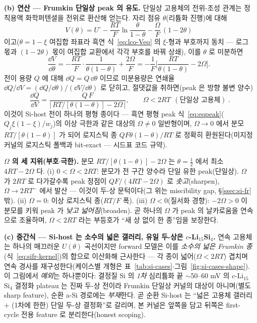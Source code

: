 \textbf{(b) 연산 --- Frumkin 단일상 peak 의 유도.} 단일상 고용체의 전위-조성 관계는 정칙용액 화학퍼텐셜을 전위로
환산해 얻는다. 자리 점유 $\theta$(리튬화 진행)에 대해
\begin{equation}
V(\theta)=U^\circ-\frac{RT}{F}\ln\frac{\theta}{1-\theta}-\frac{\Omega}{F}\,(1-2\theta)
\label{eq:sifr-V}
\end{equation}
이고($\theta{=}1{-}\xi$ 여집합 좌표라 흑연 식~\eqref{eq:lco-Veq} 의 $\xi$-형과 부호까지 동치 --- 로그 몫과
$(1-2\theta)$ 몫이 여집합 교환에서 각각 부호를 바꿔 상쇄), 이를 $\theta$ 로 미분하면
\begin{equation}
\frac{\dd V}{\dd\theta}=-\frac{RT}{F}\cdot\frac{1}{\theta(1-\theta)}+\frac{2\Omega}{F}
=-\frac{1}{F}\Big[\frac{RT}{\theta(1-\theta)}-2\Omega\Big].
\label{eq:sifr-dVdtheta}
\end{equation}
전이 용량 $Q$ 에 대해 $\dd Q=Q\,\dd\theta$ 이므로 미분용량은 연쇄율 $\dd Q/\dd V=(\dd Q/\dd\theta)/(\dd V/\dd\theta)$
로 닫히고, 절댓값을 취하면(peak 은 방향 불변 양수)
\begin{equation}
\boxed{\;\frac{\dd Q}{\dd V}=\frac{Q\,F}{\big|\,RT/[\theta(1-\theta)]-2\Omega\,\big|},
\qquad \Omega<2RT\ \ (\text{단일상 고용체})\;.}
\label{eq:sifr-kernel}
\end{equation}
이것이 Si-host 전이 하나의 평형 종이다 --- 흑연 평형 peak 식~\eqref{eq:eqpeak}($Q_j\xi(1-\xi)/w_j$)의 이상 극한과
같은 대상의 $\Omega\ne0$ 일반형이며, $\Omega{\to}0$ 에서 분모 $RT/[\theta(1-\theta)]$ 가 되어 로지스틱 종
$QF\theta(1-\theta)/RT$ 로 정확히 환원된다(미지정 커널의 로지스틱 폴백과 bit-exact --- 시드표 코드 규약).

\begin{signbox}
\textbf{$\Omega$ 의 세 지위(부호$\cdot$극한).} 분모 $RT/[\theta(1-\theta)]-2\Omega$ 는 $\theta{=}\tfrac12$ 에서
최소 $4RT-2\Omega$ 다. (i) $0<\Omega<2RT$: 분모가 전 구간 양수라 단일 유한 peak(단일상). $\Omega$ 가 $2RT$ 로
다가갈수록 peak 정점이 $Q F/(4RT-2\Omega)$ 로 \emph{솟고}(sharpen), $\Omega{\to}2RT^-$ 에서 발산 --- 이것이 두-상
문턱이다(그 위는 miscibility gap, \S\ref{ssec:si-fr} 밖). (ii) $\Omega{=}0$: 이상 로지스틱 종($RT/F$ 폭). (iii)
$\Omega<0$(질서화 경향): $-2\Omega>0$ 이 분모를 키워 peak 가 \emph{낮고 넓어짐}(broaden). 곧 하나의 $\Omega$ 가
peak 의 날카로움을 연속으로 조율하며, $\Omega<2RT$ 라는 부등호가 ``새 상 없이 한 종''임을 보장한다.
\end{signbox}

\textbf{(c) 중간식 --- Si-host 는 소수의 넓은 갤러리, 유일 두-상은 $c$-Li$_{15}$Si$_4$.} 연속 고용체는 하나의
매끄러운 $U(\theta)$ 곡선이지만 forward 모델은 이를 \emph{소수의 넓은 Frumkin 종}(식~\eqref{eq:sifr-kernel})의
합으로 이산화해 근사한다 --- 각 종이 넓어($\Omega<2RT$) 겹치며 연속 경사를 재구성한다(케이스별 개형은
표~\ref{tab:si-cases}$\cdot$그림~\ref{fig:si-cases-shape}). 이 그림에서 \emph{예외}는 하나뿐이다: 결정질 Si 의
\emph{1차} 심리튬화 끝 $\sim$50--60 mV 의 $c$-Li$_{15}$Si$_4$ 결정화 plateau 는 진짜 두-상 전이라\cite{obrovac_christensen2004,ogata_nmr2014}
Frumkin 단일상 커널의 대상이 아니며(별도 sharp feature), 순환 a-Si 경로에는 \emph{부재}한다\cite{chevrier_dahn2009}.
곧 순환 Si-host 는 ``넓은 고용체 갤러리 $+$ (1차에 한한) 단일 두-상 결정화''로 갈리며, 본 커널은 앞쪽을 담고
뒤쪽은 first-cycle 전용 feature 로 분리한다(honest scoping).


